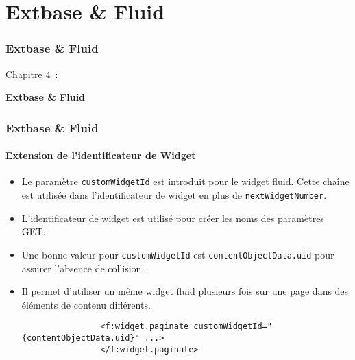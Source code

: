 %

\section{Extbase \& Fluid}
\begin{frame}[fragile]
	\frametitle{Extbase \& Fluid}

	\begin{center}\huge{Chapitre 4~:}\end{center}
	\begin{center}\huge{\color{typo3darkgrey}\textbf{Extbase \& Fluid}}\end{center}

\end{frame}


\begin{frame}[fragile]
	\frametitle{Extbase \& Fluid}
	\framesubtitle{Extension de l'identificateur de Widget}

	\begin{itemize}
		\item Le paramètre \texttt{customWidgetId} est introduit pour le widget fluid.
			Cette chaîne est utilisée dans l'identificateur de widget en plus de
			\texttt{nextWidgetNumber}.

		\item L'identificateur de widget est utilisé pour créer les noms des paramètres GET.

		\item Une bonne valeur pour \texttt{customWidgetId} est \texttt{{contentObjectData.uid}} pour assurer l'absence de collision.

		\item Il permet d'utiliser un même widget fluid plusieurs fois sur une page dans des
		 	éléments de contenu différents.

			\begin{lstlisting}
				<f:widget.paginate customWidgetId="{contentObjectData.uid}" ...>
				</f:widget.paginate>
			\end{lstlisting}

	\end{itemize}

\end{frame}

